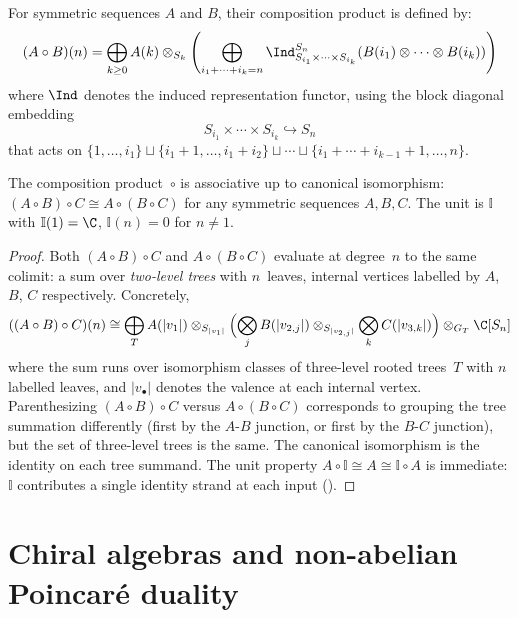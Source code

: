 \begin{definition}
For symmetric sequences $A$ and $B$, their composition product is defined by:
\[
(A \circ B)(n) = \bigoplus_{k \geq 0} A(k) \otimes_{S_k} \left( \bigoplus_{i_1 + \cdots + i_k = n} \Ind_{S_{i_1} \times \cdots \times S_{i_k}}^{S_n}(B(i_1) \otimes \cdots \otimes B(i_k)) \right)
\]
where $\Ind$ denotes the induced representation functor, using the block diagonal embedding
\[
S_{i_1} \times \cdots \times S_{i_k} \hookrightarrow S_n
\]
that acts on $\{1, \ldots, i_1\} \sqcup \{i_1 + 1, \ldots, i_1 + i_2\} \sqcup \cdots \sqcup \{i_1 + \cdots + i_{k-1} + 1, \ldots, n\}$.
\end{definition}

\begin{proposition}\label{prop:circ-associative}
The composition product~$\circ$ is associative up to
canonical isomorphism:
$(A \circ B) \circ C \cong A \circ (B \circ C)$ for any
symmetric sequences $A, B, C$. The unit is
$\mathbb{I}$ with $\mathbb{I}(1) = \C$,
$\mathbb{I}(n) = 0$ for $n \neq 1$.
\end{proposition}

\begin{proof}
Both $(A \circ B) \circ C$ and $A \circ (B \circ C)$
evaluate at degree~$n$ to the same colimit: a sum over
\emph{two-level trees} with $n$~leaves, internal vertices
labelled by $A$, $B$, $C$ respectively. Concretely,
\[
((A \circ B) \circ C)(n)
\cong \bigoplus_T A(|v_1|) \otimes_{S_{|v_1|}}
 \Bigl(\bigotimes_j B(|v_{2,j}|) \otimes_{S_{|v_{2,j}|}}
 \bigotimes_k C(|v_{3,k}|)\Bigr)
 \otimes_{G_T} \C[S_n]
\]
where the sum runs over isomorphism classes of three-level
rooted trees~$T$ with $n$ labelled leaves, and
$|v_\bullet|$ denotes the valence at each internal vertex.
Parenthesizing $(A \circ B) \circ C$ versus
$A \circ (B \circ C)$ corresponds to grouping the
tree summation differently (first by the $A$-$B$ junction,
or first by the $B$-$C$ junction), but the set of
three-level trees is the same. The canonical isomorphism
is the identity on each tree summand. The unit property
$A \circ \mathbb{I} \cong A \cong \mathbb{I} \circ A$ is
immediate: $\mathbb{I}$ contributes a single identity
strand at each input
(\cite[Proposition~5.1.3]{LV12}).
\end{proof}

\section{Chiral algebras and non-abelian Poincaré duality}
\label{sec:chiral-NAP}

